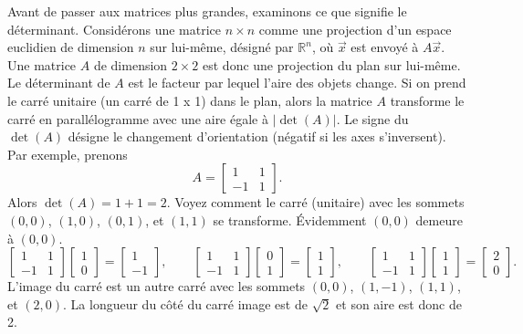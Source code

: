Avant de passer aux matrices plus grandes, examinons ce que signifie le déterminant. Considérons une matrice $n \times n$
comme une projection d’un espace euclidien de dimension $n$ sur lui-même, désigné par ${\mathbb{R}}^n$, où $\vec{x}$ est envoyé à $A \vec{x}$.
Une matrice $A$ de dimension $2 \times 2$ est donc une projection du plan sur lui-même. Le déterminant de 
$A$ est le facteur par lequel l’aire des objets change. Si on prend le carré unitaire (un carré de 1 x 1) dans le plan, alors la matrice
$A$ transforme le carré en parallélogramme avec une aire égale à $\lvert\det(A)\rvert$.  Le signe
du $\det(A)$ désigne le changement d'orientation (négatif si les axes s’inversent). Par exemple, prenons
\begin{equation*}
A =
\begin{bmatrix}
1 & 1 \\
-1 & 1
\end{bmatrix} .
\end{equation*}
Alors $\det(A) = 1+1 = 2$.  Voyez comment le carré (unitaire) avec les sommets
$(0,0)$, $(1,0)$, $(0,1)$, et $(1,1)$ se transforme.  Évidemment $(0,0)$ demeure à $(0,0)$.  
\begin{equation*}
\begin{bmatrix}
1 & 1 \\
-1 & 1
\end{bmatrix}
\begin{bmatrix}
1 \\ 0
\end{bmatrix} =
\begin{bmatrix}
1 \\
-1 
\end{bmatrix}
,
\qquad
\begin{bmatrix}
1 & 1 \\
-1 & 1
\end{bmatrix}
\begin{bmatrix}
0 \\ 1
\end{bmatrix} =
\begin{bmatrix}
1 \\
1 
\end{bmatrix}
,
\qquad
\begin{bmatrix}
1 & 1 \\
-1 & 1
\end{bmatrix}
\begin{bmatrix}
1 \\ 1
\end{bmatrix} =
\begin{bmatrix}
2 \\
0 
\end{bmatrix}
.
\end{equation*}
L’image du carré est un autre carré avec les sommets $(0,0)$, $(1,-1)$,
$(1,1)$, et $(2,0)$. La longueur du côté du carré image est de $\sqrt{2}$ et son aire est donc de 2.

